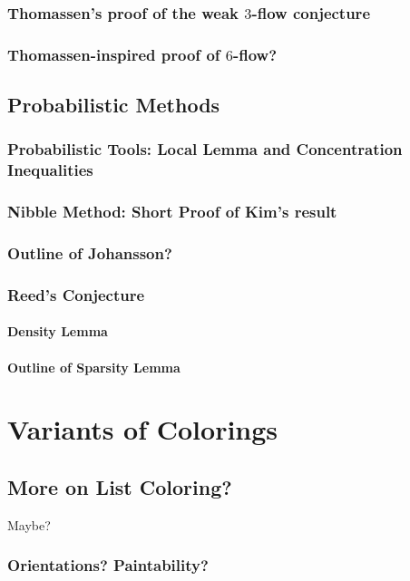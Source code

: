 \documentclass[12pt,twoside,openright,a4paper]{book}
\begin{document}
\section{Thomassen's proof of the weak $3$-flow conjecture}
\section{Thomassen-inspired proof of $6$-flow?}

\chapter{Probabilistic Methods}
\section{Probabilistic Tools: Local Lemma and Concentration Inequalities}
\section{Nibble Method: Short Proof of Kim's result}
\section{Outline of Johansson?}
\section{Reed's Conjecture}
\subsection{Density Lemma}
\subsection{Outline of Sparsity Lemma}

\part{Variants of Colorings}

\chapter{More on List Coloring?}

Maybe?

\section{Orientations? Paintability?}
\end{document}
